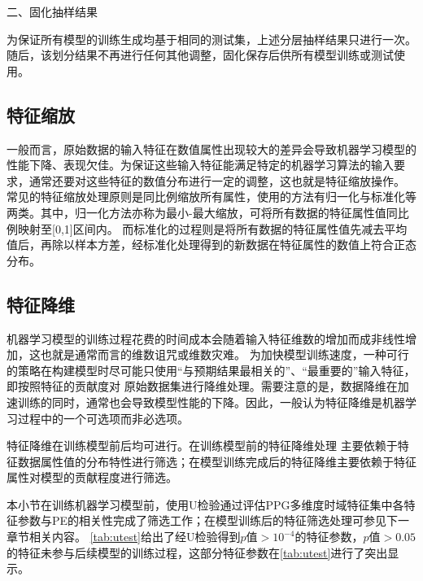 二、固化抽样结果

为保证所有模型的训练生成均基于相同的测试集，上述分层抽样结果只进行一次。随后，该划分结果不再进行任何其他调整，固化保存后供所有模型训练或测试使用。

\subsection{特征缩放}
一般而言，原始数据的输入特征在数值属性出现较大的差异会导致机器学习模型的性能下降、表现欠佳\cite{Aurélien2018}。为保证这些输入特征能满足特定的机器学习算法的输入要求，通常还要对这些特征的数值分布进行一定的调整，这也就是特征缩放操作。
常见的特征缩放处理原则是同比例缩放所有属性，使用的方法有归一化与标准化等两类。其中，归一化方法亦称为最小-最大缩放，可将所有数据的特征属性值同比例映射至[0,1]区间内。
而标准化的过程则是将所有数据的特征属性值先减去平均值后，再除以样本方差，经标准化处理得到的新数据在特征属性的数值上符合正态分布。 

\subsection{特征降维}
机器学习模型的训练过程花费的时间成本会随着输入特征维数的增加而成非线性增加，这也就是通常而言的维数诅咒或维数灾难。
为加快模型训练速度，一种可行的策略在构建模型时尽可能只使用“与预期结果最相关的”、“最重要的”输入特征，即按照特征的贡献度对
原始数据集进行降维处理。需要注意的是，数据降维在加速训练的同时，通常也会导致模型性能的下降。因此，一般认为特征降维是机器学习过程中的一个可选项而非必选项。


特征降维在训练模型前后均可进行。在训练模型前的特征降维处理
主要依赖于特征数据属性值的分布特性进行筛选；在模型训练完成后的特征降维主要依赖于特征属性对模型的贡献程度进行筛选。

本小节在训练机器学习模型前，使用U检验通过评估PPG多维度时域特征集中各特征参数与PE的相关性完成了筛选工作；在模型训练后的特征筛选处理可参见下一章节相关内容。
\autoref{tab:utest}给出了经U检验得到$p$值$>10^{-4}$的特征参数，$p$值$> 0.05$的特征未参与后续模型的训练过程，这部分特征参数在\autoref{tab:utest}进行了突出显示。

